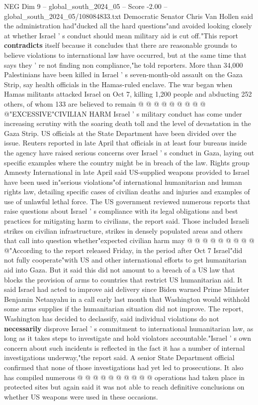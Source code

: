 \begin{textsample}{NEG Dim 9 – global\_south\_2024\_05 – Score -2.00 – global\_south\_2024\_05/108084833.txt}
Democratic Senator Chris Van Hollen said the administration had"ducked all the hard questions"and avoided looking closely at whether Israel ' s conduct should mean military aid is cut off."This report \textbf{contradicts} itself because it concludes that there are reasonable grounds to believe violations to international law have occurred, but at the same time that says they ' re not finding non compliance,"he told reporters.
More than 34,000 Palestinians have been killed in Israel ' s seven-month-old assault on the Gaza Strip, say health officials in the Hamas-ruled enclave.
The war began when Hamas militants attacked Israel on Oct 7, killing 1,200 people and abducting 252 others, of whom 133 are believed to remain @ @ @ @ @ @ @ @ @ @"EXCESSIVE"CIVILIAN HARM Israel ' s military conduct has come under increasing scrutiny with the soaring death toll and the level of devastation in the Gaza Strip.
US officials at the State Department have been divided over the issue.
Reuters reported in late April that officials in at least four bureaus inside the agency have raised serious concerns over Israel ' s conduct in Gaza, laying out specific examples where the country might be in breach of the law.
Rights group Amnesty International in late April said US-supplied weapons provided to Israel have been used in"serious violations"of international humanitarian and human rights law, detailing specific cases of civilian deaths and injuries and examples of use of unlawful lethal force.
The US government reviewed numerous reports that raise questions about Israel ' s compliance with its legal obligations and best practices for mitigating harm to civilians, the report said.
Those included Israeli strikes on civilian infrastructure, strikes in densely populated areas and others that call into question whether"expected civilian harm may @ @ @ @ @ @ @ @ @ @"According to the report released Friday, in the period after Oct 7 Israel"did not fully cooperate"with US and other international efforts to get humanitarian aid into Gaza.
But it said this did not amount to a breach of a US law that blocks the provision of arms to countries that restrict US humanitarian aid.
It said Israel had acted to improve aid delivery since Biden warned Prime Minister Benjamin Netanyahu in a call early last month that Washington would withhold some arms supplies if the humanitarian situation did not improve.
The report, Washington has decided to declassify, said individual violations do not \textbf{necessarily} disprove Israel ' s commitment to international humanitarian law, as long as it takes steps to investigate and hold violators accountable."Israel ' s own concern about such incidents is reflected in the fact it has a number of internal investigations underway,"the report said.
A senior State Department official confirmed that none of those investigations had yet led to prosecutions.
It also has compiled numerous @ @ @ @ @ @ @ @ @ @ operations had taken place in protected sites but again said it was not able to reach definitive conclusions on whether US weapons were used in these occasions.

\end{textsample}
